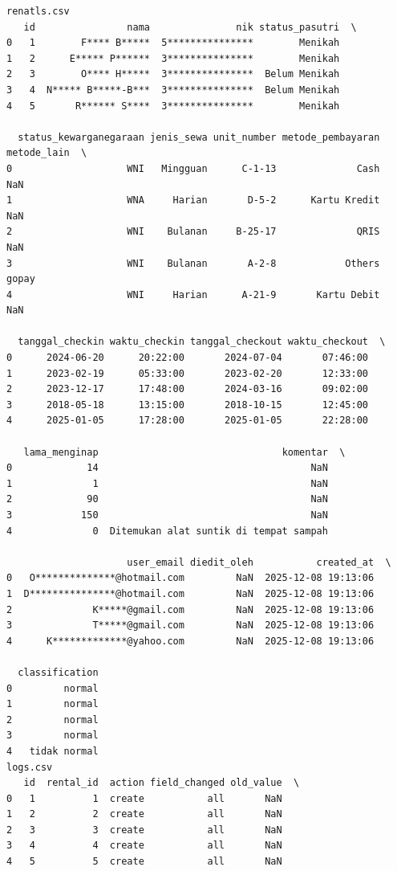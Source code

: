 \begin{lstlisting}[caption={Output 12}]
renatls.csv
   id                nama               nik status_pasutri  \
0   1        F**** B*****  5***************        Menikah   
1   2      E***** P******  3***************        Menikah   
2   3        O**** H*****  3***************  Belum Menikah   
3   4  N***** B*****-B***  3***************  Belum Menikah   
4   5       R****** S****  3***************        Menikah   

  status_kewarganegaraan jenis_sewa unit_number metode_pembayaran metode_lain  \
0                    WNI   Mingguan      C-1-13              Cash         NaN   
1                    WNA     Harian       D-5-2      Kartu Kredit         NaN   
2                    WNI    Bulanan     B-25-17              QRIS         NaN   
3                    WNI    Bulanan       A-2-8            Others       gopay   
4                    WNI     Harian      A-21-9       Kartu Debit         NaN   

  tanggal_checkin waktu_checkin tanggal_checkout waktu_checkout  \
0      2024-06-20      20:22:00       2024-07-04       07:46:00   
1      2023-02-19      05:33:00       2023-02-20       12:33:00   
2      2023-12-17      17:48:00       2024-03-16       09:02:00   
3      2018-05-18      13:15:00       2018-10-15       12:45:00   
4      2025-01-05      17:28:00       2025-01-05       22:28:00   

   lama_menginap                                komentar  \
0             14                                     NaN   
1              1                                     NaN   
2             90                                     NaN   
3            150                                     NaN   
4              0  Ditemukan alat suntik di tempat sampah   

                     user_email diedit_oleh           created_at  \
0   O**************@hotmail.com         NaN  2025-12-08 19:13:06   
1  D***************@hotmail.com         NaN  2025-12-08 19:13:06   
2              K*****@gmail.com         NaN  2025-12-08 19:13:06   
3              T*****@gmail.com         NaN  2025-12-08 19:13:06   
4      K*************@yahoo.com         NaN  2025-12-08 19:13:06   

  classification  
0         normal  
1         normal  
2         normal  
3         normal  
4   tidak normal  
logs.csv
   id  rental_id  action field_changed old_value  \
0   1          1  create           all       NaN   
1   2          2  create           all       NaN   
2   3          3  create           all       NaN   
3   4          4  create           all       NaN   
4   5          5  create           all       NaN   


\end{lstlisting}
